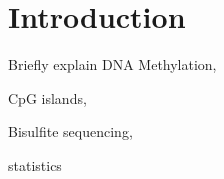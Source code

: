 \section{Introduction}

Briefly explain DNA Methylation, 

CpG islands, 

Bisulfite sequencing, 

statistics
  
  
  
  
  
  